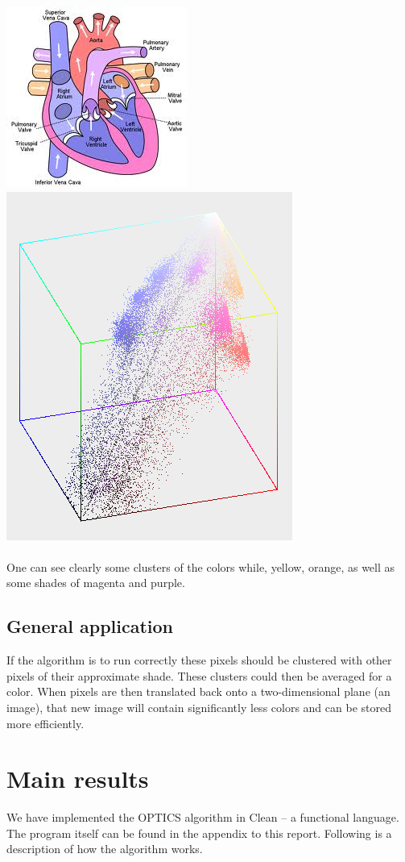 \documentclass[12pt,a4paper]{article}
\begin{document}
\includegraphics[scale=0.6]{img/diagram.png}
\includegraphics[scale=0.6]{img/colorplot.png}
\\
\\
One can see clearly some clusters of the colors while, yellow, orange, as well as some shades of magenta and purple.

\subsection{General application}
If the algorithm is to run correctly these pixels should be clustered with other pixels of their approximate shade. These clusters could then be averaged for a color. When pixels are then translated back onto a two-dimensional plane (an image), that new image will contain significantly less colors and can be stored more efficiently.

\clearpage
\section{Main results}
We have implemented the OPTICS algorithm in Clean – a functional language. The program itself can be found in the appendix to this report. Following is a description of how the algorithm works.
\end{document}
